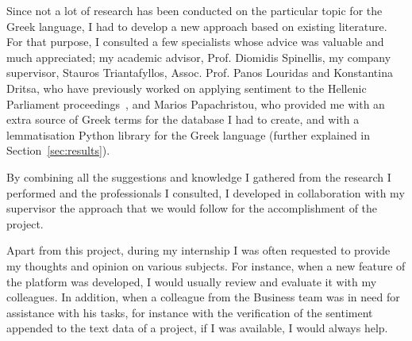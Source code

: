 Since not a lot of research has been conducted
on the particular topic for the Greek language,
I had to develop a new approach based on existing literature.
For that purpose, I consulted a few specialists
whose advice was valuable and much appreciated;
my academic advisor, Prof. Diomidis Spinellis,
my company supervisor, Stauros Triantafyllos,
Assoc. Prof. Panos Louridas and Konstantina Dritsa,
who have previously worked on applying sentiment
to the Hellenic Parliament proceedings~\cite{Dri18},
and Marios Papachristou,
who provided me with an extra source of Greek terms
for the database I had to create,
and with a lemmatisation Python library for the Greek language
(further explained in Section~\ref{sec:results}).

By combining all the suggestions and knowledge I gathered
from the research I performed and the professionals I consulted,
I developed in collaboration with my supervisor
the approach that we would follow
for the accomplishment of the project.

Apart from this project,
during my internship I was often requested
to provide my thoughts and opinion on various subjects.
For instance, when a new feature of the platform was developed,
I would usually review and evaluate it with my colleagues.
In addition, when a colleague from the Business team
was in need for assistance with his tasks,
for instance with the verification of the sentiment appended
to the text data of a project,
if I was available, I would always help.
